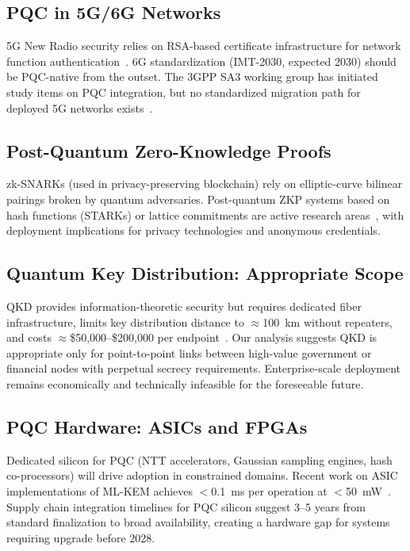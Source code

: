 \documentclass[journal]{IEEEtran}
\begin{document}
\subsection{PQC in 5G/6G Networks}

5G New Radio security relies on RSA-based certificate infrastructure for network
function authentication~\cite{3gpp2023security}. 6G standardization (IMT-2030,
expected 2030) should be PQC-native from the outset. The 3GPP SA3 working group
has initiated study items on PQC integration, but no standardized migration
path for deployed 5G networks exists~\cite{europeancommission2022b5g}.

\subsection{Post-Quantum Zero-Knowledge Proofs}

zk-SNARKs (used in privacy-preserving blockchain) rely on elliptic-curve
bilinear pairings broken by quantum adversaries. Post-quantum ZKP systems
based on hash functions (STARKs) or lattice commitments are active research
areas~\cite{boneh2020lattice}, with deployment implications for privacy
technologies and anonymous credentials.

\subsection{Quantum Key Distribution: Appropriate Scope}

QKD provides information-theoretic security but requires dedicated fiber
infrastructure, limits key distribution distance to $\approx$100~km without
repeaters, and costs $\approx$\$50,000--\$200,000 per endpoint~\cite{pirandola2020advances}.
Our analysis suggests QKD is appropriate only for point-to-point links between
high-value government or financial nodes with perpetual secrecy requirements.
Enterprise-scale deployment remains economically and technically infeasible
for the foreseeable future.

\subsection{PQC Hardware: ASICs and FPGAs}

Dedicated silicon for PQC (NTT accelerators, Gaussian sampling engines,
hash co-processors) will drive adoption in constrained domains. Recent work
on ASIC implementations of ML-KEM achieves $<$0.1~ms per operation at
$<$50~mW~\cite{ngo2021hardware}. Supply chain integration timelines for
PQC silicon suggest 3--5 years from standard finalization to broad availability,
creating a hardware gap for systems requiring upgrade before 2028.
\end{document}
